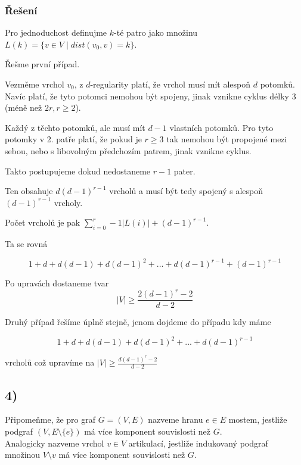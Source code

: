\documentclass[../main.tex]{subfiles}
\begin{document}
\subsubsection*{Řešení}

Pro jednoduchost definujme $k$-té patro jako množinu $L(k) = \{v\in V\mid dist(v_0, v) = k \}$.

Řešme první případ. 


Vezměme vrchol $v_0$, z $d$-regularity platí, že vrchol musí mít alespoň $d$ potomků. 
Navíc platí, že tyto potomci nemohou být spojeny, jinak vznikne cyklus délky $3$ (méně než $2r, r\geq 2$).

Každý z těchto potomků, ale musí mít $d-1$ vlastních potomků. Pro tyto potomky v 2. patře platí, 
že pokud je $r\geq 3$ tak nemohou být propojené mezi sebou, nebo s libovolným předchozím patrem, jinak vznikne cyklus.

Takto postupujeme dokud nedostaneme $r-1$ pater. 

Ten obsahuje $d(d-1)^{r-1}$ vrcholů a musí být tedy spojený s alespoň $(d-1)^{r-1}$ vrcholy.

Počet vrcholů je pak $\sum_{i=0}^r-1 |L(i)| + (d-1)^{r-1}$.

Ta se rovná 

\begin{equation*}
    1 + d + d(d-1) + d(d-1)^2 + ... + d(d-1)^{r-1} + (d-1)^{r-1}
\end{equation*}

Po upravách dostaneme tvar 
\begin{equation*}
    |V| \geq \frac{2(d-1)^r -2}{d-2}
\end{equation*}


Druhý případ řešíme úplně stejně, jenom dojdeme do případu kdy máme 

\begin{equation*}
    1 + d + d(d-1) + d(d-1)^2 + ... + d(d-1)^{r-1} 
\end{equation*}

vrcholů což upravíme na $|V|\geq \frac{d(d-1)^r -2}{d-2}$


\subsection{4)}
Připomeňme, že pro graf $G=(V,E)$ nazveme hranu $e\in E$ mostem, jestliže podgraf $(V,E\setminus\{e\})$ má více komponent souvislosti než $G$.\\
Analogicky nazveme vrchol $v\in V$ artikulací, jestliže indukovaný podgraf množinou $V\setminus{v}$ má více komponent souvislosti než $G$.
\end{document}
